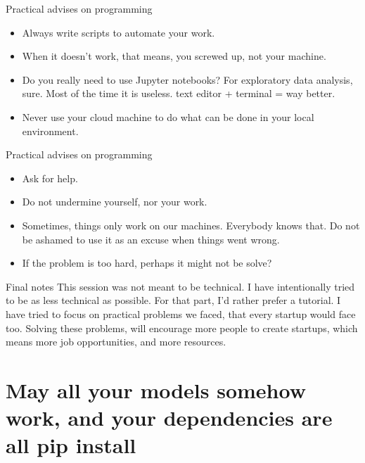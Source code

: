 \documentclass{beamer}
\begin{document}
\begin{frame}{Practical advises on programming}
  \begin{itemize}
  \item Always write scripts to automate your work.
  \item When it doesn't work, that means, you screwed up, not your machine.
    \item Do you really need to use Jupyter notebooks? For exploratory data
      analysis, sure. Most of the time it is useless. text editor + terminal =
      way better.
      \item Never use your cloud machine to do what can be done in your local
        environment.
 
  \end{itemize}
\end{frame}
\begin{frame}{Practical advises on programming}
  \begin{itemize}
          \item Ask for help.
      \item Do not undermine yourself, nor your work.
        \item Sometimes, things only work on our machines. Everybody knows that.
          Do not be ashamed to use it as an excuse when things went wrong.
          \item If the problem is too hard, perhaps it might not be solve? 
  \end{itemize}
\end{frame}

\begin{frame}{Final notes}
  This session was not meant to be technical. I have intentionally tried to be
  as less technical as possible. For that part, I'd rather prefer a tutorial. I
  have tried to focus on practical problems we faced, that every startup would
  face too. Solving these problems, will encourage more people to create
  startups, which means more job opportunities, and more resources.  
\end{frame}

\section{May all your models somehow work, and your dependencies are all pip
  install }
\end{document}
